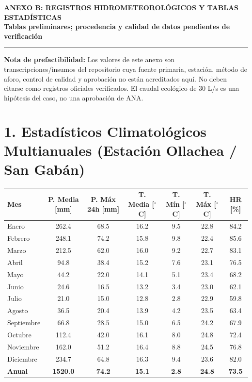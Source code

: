 \documentclass[11pt,a4paper]{article}
\begin{document}
\begin{center}
    {\LARGE\bfseries\textcolor{navyblue}{ANEXO B: REGISTROS HIDROMETEOROLÓGICOS Y TABLAS ESTADÍSTICAS}}\\[0.6em]
    {\large\bfseries Tablas preliminares; procedencia y calidad de datos pendientes de verificación}\\[1.2em]
    \rule{\linewidth}{1.2pt}
\end{center}

\noindent\textbf{Nota de prefactibilidad:} Los valores de este anexo son transcripciones/insumos del repositorio cuya fuente primaria, estación, método de aforo, control de calidad y aprobación no están acreditados aquí. No deben citarse como registros oficiales verificados. El caudal ecológico de 30 L/s es una hipótesis del caso, no una aprobación de ANA.


\section*{1. Estadísticos Climatológicos Multianuales (Estación Ollachea / San Gabán)}
\begin{table}[h!]
\centering
\small
\begin{tabular}{lcccccc}
\toprule
\textbf{Mes} & \textbf{P. Media [mm]} & \textbf{P. Máx 24h [mm]} & \textbf{T. Media [$^\circ$C]} & \textbf{T. Mín [$^\circ$C]} & \textbf{T. Máx [$^\circ$C]} & \textbf{HR [\%]} \\
\midrule
Enero & 262.4 & 68.5 & 16.2 & 9.5 & 22.8 & 84.2 \\
Febrero & 248.1 & 74.2 & 15.8 & 9.8 & 22.4 & 85.6 \\
Marzo & 212.5 & 62.0 & 16.0 & 9.2 & 22.7 & 83.1 \\
Abril & 94.8 & 38.4 & 15.2 & 7.6 & 23.1 & 76.5 \\
Mayo & 44.2 & 22.0 & 14.1 & 5.1 & 23.4 & 68.2 \\
Junio & 24.6 & 16.5 & 13.2 & 3.4 & 23.0 & 62.1 \\
Julio & 21.0 & 15.0 & 12.8 & 2.8 & 22.9 & 59.8 \\
Agosto & 36.5 & 20.4 & 13.9 & 4.2 & 23.5 & 63.4 \\
Septiembre & 66.8 & 28.5 & 15.0 & 6.5 & 24.2 & 67.9 \\
Octubre & 112.4 & 42.0 & 16.1 & 8.0 & 24.8 & 72.4 \\
Noviembre & 162.0 & 51.2 & 16.4 & 8.8 & 24.5 & 76.8 \\
Diciembre & 234.7 & 64.8 & 16.3 & 9.4 & 23.6 & 82.0 \\
\midrule
\textbf{Anual} & \textbf{1520.0} & \textbf{74.2} & \textbf{15.1} & \textbf{2.8} & \textbf{24.8} & \textbf{73.5} \\
\bottomrule
\end{tabular}
\end{table}
\end{document}
